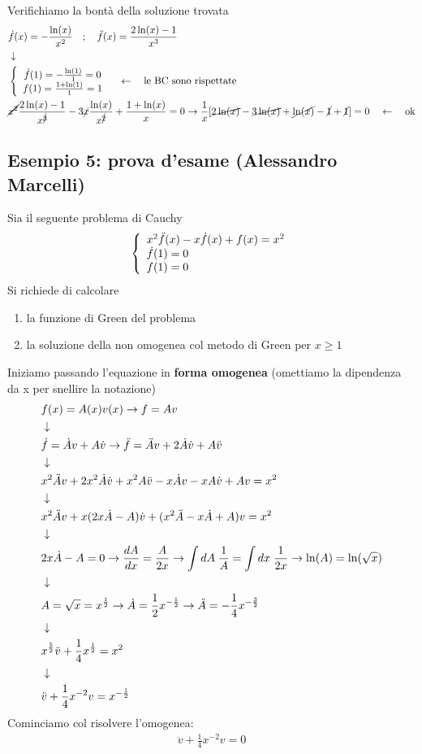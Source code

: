 Verifichiamo la bontà della soluzione trovata
\begin{align}
	&\dot{f}(x) = -\frac{\ln(x)}{x^2} \quad ; \quad \ddot{f}(x) = \frac{2\ln(x) -1}{x^3} \\ &\downarrow \nonumber \\
	&\left\{ \begin{array}{cc} \dot{f}(1) = -\frac{\ln(1)}{1}=0 \\ f(1) = \frac{1 + \ln(1)}{1} = 1 \end{array} \right. \quad \leftarrow \quad \text{le BC sono rispettate}\\
	&\cancel{x^2}\frac{2\ln(x) -1}{x^{\cancel{3}}} - 3\cancel{x} \frac{\ln(x)}{x^{\cancel{2}}} + \frac{1+\ln(x)}{x} = 0 \to \frac{1}{x}[\cancel{2\ln(x)} -\cancel{3\ln(x)} + \cancel{\ln(x)} -\cancel{1} +\cancel{1}] = 0 \quad \leftarrow \quad \text{ok}
\end{align}
\newpage 
\subsection{Esempio 5: prova d'esame (Alessandro Marcelli)}
Sia il seguente problema di Cauchy
\begin{align}
	\triple{x^2 \ddot{f}(x) - x \dot{f}(x) + f(x) = x^2}{\dot{f}(1) = 0\hfill}{f(1)=0\hfill}
\end{align}
Si richiede di calcolare
\begin{enumerate}
	\item la funzione di Green del problema
	\item la soluzione della non omogenea col metodo di Green per $x\geq 1$
\end{enumerate}
Iniziamo passando l'equazione in \textbf{forma omogenea} (omettiamo la dipendenza da x per snellire la notazione)
\begin{align}
	&f(x) = A(x)v(x) \to f=Av\\ &\downarrow \nonumber \\
	&\dot{f} = \dot{A}v + A \dot{v} \to \ddot{f} = \ddot{A}v + 2 \dot{A}\dot{v} + A \ddot{v} \nonumber \\ &\downarrow \nonumber \\
	&x^2 \ddot{A}v + 2x^2 \dot{A}\dot{v} +x^2 A \ddot{v} -x\dot{A}v -x A \dot{v} + Av = x^2\nonumber \\ &\downarrow \nonumber \\
	& x^2 \ddot{A}v +x(2x \dot{A} - A) \dot{v} + (x^2 \ddot{A} - x \dot{A} + A)v = x^2\nonumber \\ &\downarrow \nonumber \\
	&2x \dot{A} - A = 0 \to \frac{dA}{dx} = \frac{A}{2x} \to \int dA \; \frac{1}{A} = \int dx \; \frac{1}{2x} \to \ln(A) = \ln(\sqrt{x}) \nonumber \\ &\downarrow \nonumber \\
	&A = \sqrt{x} = x^{\frac{1}{2}} \to \dot{A} = \frac{1}{2}x^{-\frac{1}{2}} \to \ddot{A} = -\frac{1}{4}x^{-\frac{3}{2}} \nonumber \\ &\downarrow \nonumber \\
	&x^{\frac{5}{2}} \ddot{v} + \frac{1}{4} x^{\frac{1}{2}} = x^2\nonumber \\ &\downarrow \nonumber \\
	&\ddot{v} +\frac{1}{4} x^{-2} v = x^{-\frac{1}{2}}
\end{align}
Cominciamo col risolvere l'omogenea:
\begin{align}
	\ddot{v} +\frac{1}{4} x^{-2} v = 0 
\end{align}
